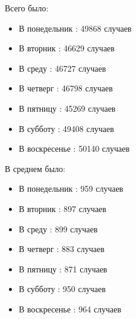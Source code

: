\documentclass[a4paper]{article}
\begin{document}
	\begin{minipage}{0.45\textwidth}
		\begin{center}
			Всего было:
			\begin{itemize}
				\item В понедельник : 49868 случаев
				\item В вторник     : 46629 случаев
				\item В среду       : 46727 случаев
				\item В четверг     : 46798 случаев
				\item В пятницу     : 45269 случаев
				\item В субботу     : 49408 случаев
				\item В воскресенье : 50140 случаев
			\end{itemize}
		\end{center}
	\end{minipage}
	\hfill
	\begin{minipage}{0.45\textwidth}
		\begin{center}
			В среднем было:
			\begin{itemize}
				\item В понедельник : 959 случаев
				\item В вторник     : 897 случаев
				\item В среду       : 899 случаев
				\item В четверг     : 883 случаев
				\item В пятницу     : 871 случаев
				\item В субботу     : 950 случаев
				\item В воскресенье : 964 случаев
			\end{itemize}
		\end{center}
	\end{minipage}
	
\end{document}
